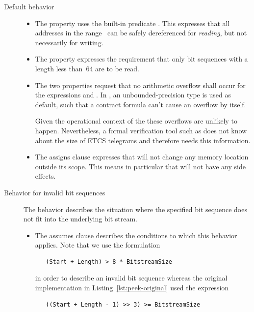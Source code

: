 \begin{description}
\item[Default behavior]

\begin{itemize}
\item
The property  uses the built-in \acsl predicate .
This expresses that all addresses in the range~
can be safely dereferenced for \emph{reading}, but not necessarily for writing.

\item
The property  expresses the requirement that only
bit sequences with a length less than~64 are to be read.
\item
The two  properties request that no arithmetic overflow
shall occur for the expressions  and
.
In \acsl, an unbounded-precision type  is used
as default, such that a contract formula can't cause an overflow by
itself.

Given the operational context of the \bitwalker these overflows are unlikely
to happen. 
Nevertheless, a formal verification tool such as \framacwp does not
know about the size of ETCS telegrams and therefore needs this information.

\item
The assigns clause expresses that \peek will not change any memory location
outside its scope.
This means in particular that \peek will not have any side effects.
      
\end{itemize}

\item[Behavior for invalid bit sequences]

The behavior  describes the situation where
the specified bit sequence does not fit into the underlying bit stream.

\begin{itemize}
\item
The assumes clause describes the conditions to which this behavior applies.
Note that we use the formulation 
\begin{verbatim}
   (Start + Length) > 8 * BitstreamSize
\end{verbatim}
in order to describe an invalid bit sequence whereas the original implementation
in Listing~\ref{lst:peek-original} used the expression
\begin{verbatim}
   ((Start + Length - 1) >> 3) >= BitstreamSize
\end{verbatim}


\end{itemize}
\end{description}
